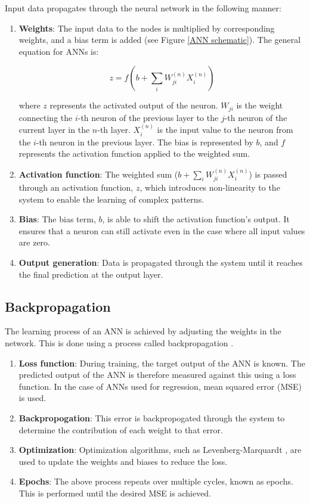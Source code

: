 Input data propagates through the neural network in the following manner:
\begin{enumerate}
	\item \textbf{Weights}: The input data to the nodes is multiplied by corresponding weights, and a bias term is added (see Figure \ref{ANN schematic}). The general equation for ANNs is:
	
	\begin{equation}\label{Generalized ANN1}
		z = f(b+\sum_i W_{j i}^{(n)} X_i^{(n)})
	\end{equation}
	
	where $z$ represents the activated output of the neuron. $W_{j i}$ is the weight connecting the $i$-th neuron of the previous layer to the $j$-th neuron of the current layer in the $n$-th layer. $X_i^{(n)}$ is the input value to the neuron from the $i$-th neuron in the previous layer. The bias is represented by $b$, and $f$ represents the activation function applied to the weighted sum.
	
	\item \textbf{Activation function}: The weighted sum ($b+\sum_i W_{j i}^{(n)} X_i^{(n)}$) is passed through an activation function, $z$, which introduces non-linearity to the system to enable the learning of complex patterns.
	
	\item \textbf{Bias}: The bias term, $b$, is able to shift the activation function's output. It ensures that a neuron can still activate even in the case where all input values are zero.
	
	\item \textbf{Output generation}: Data is propagated through the system until it reaches the final prediction at the output layer.
\end{enumerate}

\subsection{Backpropagation}

The learning process of an ANN is achieved by adjusting the weights in the network. This is done using a process called backpropagation \cite{Bishop2006}.
\begin{enumerate}
	\item \textbf{Loss function}: During training, the target output of the ANN is known. The predicted output of the ANN is therefore measured against this using a loss function. In the case of ANNs used for regression, mean squared error (MSE) is used.
	\item \textbf{Backpropogation}: This error is backpropogated through the system to determine the contribution of each weight to that error.
	\item \textbf{Optimization}: Optimization algorithms, such as Levenberg-Marquardt \cite{Levenberg1944} \cite{Marquardt1963} \cite{Wilamowski2010}, are used to update the weights and biases to reduce the loss.
	\item \textbf{Epochs}: The above process repeats over multiple cycles, known as epochs. This is performed until the desired MSE is achieved.
\end{enumerate}


